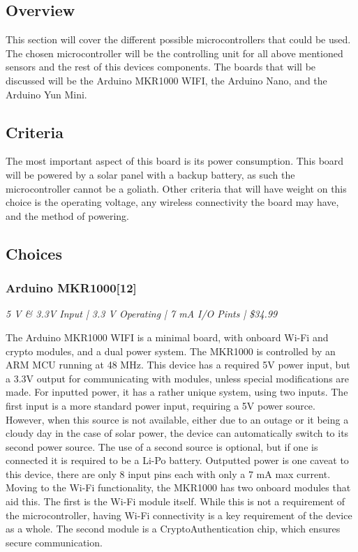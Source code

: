 \documentclass[IEEEtran,letterpaper,10pt,titlepage,fleqn,draftclsnofoot,onecolumn]{article}
\begin{document}
\subsection{Overview}

This section will cover the different possible microcontrollers that could be used. The chosen microcontroller will be the controlling unit for all above mentioned sensors and the rest of this devices components. The boards that will be discussed will be the Arduino MKR1000 WIFI, the Arduino Nano, and the Arduino Yun Mini.

\subsection{Criteria}

The most important aspect of this board is its power consumption. This board will be powered by a solar panel with a backup battery, as such the microcontroller cannot be a goliath. Other criteria that will have weight on this choice is the operating voltage, any wireless connectivity the board may have, and the method of powering.

\clearpage

\subsection{Choices}
\subsubsection{Arduino MKR1000[12]}
\textit{5 V \& 3.3V Input | 3.3 V Operating | 7 mA I/O Pints | \$34.99}

\vspace{1mm}

The Arduino MKR1000 WIFI is a minimal board, with onboard Wi-Fi and crypto modules, and a dual power system. The MKR1000 is controlled by an ARM MCU running at 48 MHz. This device has a required 5V power input, but a 3.3V output for communicating with modules, unless special modifications are made. For inputted power, it has a rather unique system, using two inputs. The first input is a more standard power input, requiring a 5V power source. However, when this source is not available, either due to an outage or it being a cloudy day in the case of solar power, the device can automatically switch to its second power source. The use of a second source is optional, but if one is connected it is required to be a Li-Po battery. Outputted power is one caveat to this device, there are only 8 input pins each with only a 7 mA max current. Moving to the Wi-Fi functionality, the MKR1000 has two onboard modules that aid this. The first is the Wi-Fi module itself. While this is not a requirement of the microcontroller, having Wi-Fi connectivity is a key requirement of the device as a whole. The second module is a CryptoAuthentication chip, which ensures secure communication. 
\end{document}

